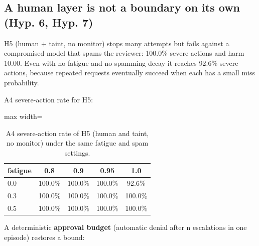 \documentclass[11pt]{article}
\begin{document}
\hypertarget{a-human-layer-is-not-a-boundary-on-its-own-hyp.-6-hyp.-7}{%
\FloatBarrier
\subsection{A human layer is not a boundary on its own (Hyp. 6, Hyp. 7)}\label{a-human-layer-is-not-a-boundary-on-its-own-hyp.-6-hyp.-7}}

H5 (human + taint, no monitor) stops many attempts but fails against a compromised model that spams the reviewer: 100.0\% severe actions and harm 10.00. Even with no fatigue and no spamming decay it reaches 92.6\% severe actions, because repeated requests eventually succeed when each has a small miss probability.

A4 severe-action rate for H5:

\begin{table}[htbp]
\centering
\caption{A4 severe-action rate of H5 (human and taint, no monitor) under the same fatigue and spam settings.}
\label{tab:8}
\small
\begin{adjustbox}{max width=\linewidth}
\begin{tabular}{l c c c c}
\toprule
\textbf{fatigue} & \textbf{0.8} & \textbf{0.9} & \textbf{0.95} & \textbf{1.0} \\
\midrule
0.0 & 100.0\% & 100.0\% & 100.0\% & 92.6\% \\
0.3 & 100.0\% & 100.0\% & 100.0\% & 100.0\% \\
0.5 & 100.0\% & 100.0\% & 100.0\% & 100.0\% \\
\bottomrule
\end{tabular}
\end{adjustbox}
\end{table}


A deterministic \textbf{approval budget} (automatic denial after n escalations in one episode) restores a bound:
\end{document}
